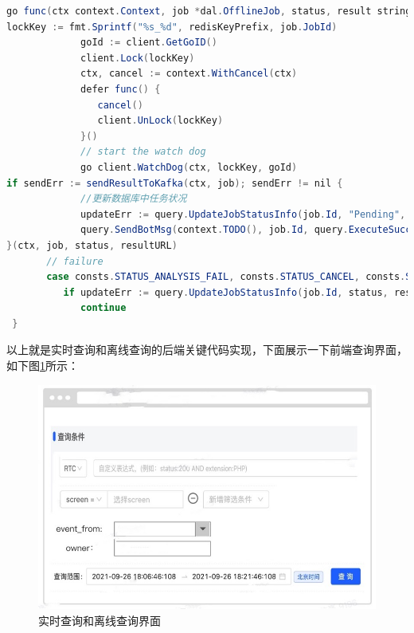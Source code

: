 \begin{longtable}[htbp]
\begin{lrbox}{\offlineSearchTimeSaoMiaoTwo}  
\begin{lstlisting}[language=Java]  
          go func(ctx context.Context, job *dal.OfflineJob, status, result string) {
lockKey := fmt.Sprintf("%s_%d", redisKeyPrefix, job.JobId)
             goId := client.GetGoID()
             client.Lock(lockKey) 
             ctx, cancel := context.WithCancel(ctx)
             defer func() {
                cancel()
                client.UnLock(lockKey)
             }()
             // start the watch dog
             go client.WatchDog(ctx, lockKey, goId)
if sendErr := sendResultToKafka(ctx, job); sendErr != nil {
             //更新数据库中任务状况
             updateErr := query.UpdateJobStatusInfo(job.Id, "Pending", "")
             query.SendBotMsg(context.TODO(), job.Id, query.ExecuteSuccess)
}(ctx, job, status, resultURL)
       // failure
       case consts.STATUS_ANALYSIS_FAIL, consts.STATUS_CANCEL, consts.STATUS_FAIL:
          if updateErr := query.UpdateJobStatusInfo(job.Id, status, resultURL); updateErr != nil {
             continue
 }
\end{lstlisting}  
\end{lrbox} 
\begin{table}[h]   
\usebox{\offlineSearchTimeSaoMiaoTwo}  
\end{table}  
\newpage
以上就是实时查询和离线查询的后端关键代码实现，下面展示一下前端查询界面，如下图\ref{offlineAndRealSearchJie}所示：
  \begin{figure}[htbp]
  \centering
  \includegraphics[scale=0.45]{figure/chapter5/实时查询和离线查询界面.jpg}
  \caption{实时查询和离线查询界面}\label{offlineAndRealSearchJie}
\end{figure}



\end{longtable}
